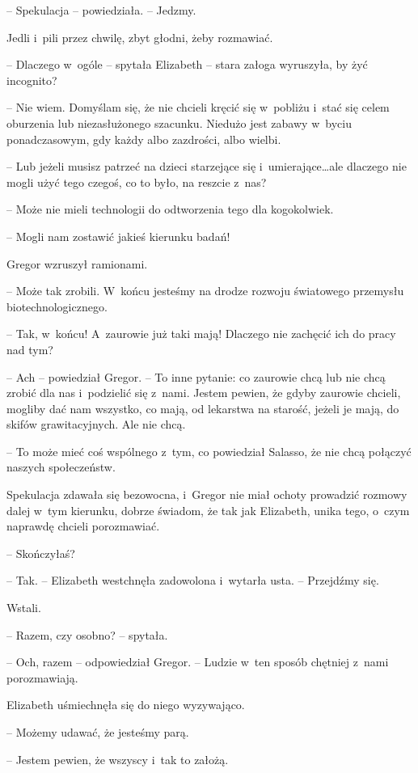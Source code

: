 \documentclass[oneside,polish,12pt,sfheadings]{mwbk}
\begin{document}
-- Spekulacja -- powiedziała. -- Jedzmy.

Jedli i~pili przez chwilę, zbyt głodni, żeby rozmawiać.

-- Dlaczego w~ogóle -- spytała Elizabeth -- stara załoga wyruszyła, by żyć
incognito?

-- Nie wiem. Domyślam się, że nie chcieli kręcić się w~pobliżu i~stać się
celem oburzenia lub niezasłużonego szacunku. Niedużo jest zabawy w~byciu
ponadczasowym, gdy każdy albo zazdrości, albo wielbi.

-- Lub jeżeli musisz patrzeć na dzieci starzejące się i~umierające\ldots ale
dlaczego nie mogli użyć tego czegoś, co to było, na reszcie z~nas?

-- Może nie mieli technologii do odtworzenia tego dla kogokolwiek.

-- Mogli nam zostawić jakieś kierunku badań!

Gregor wzruszył ramionami. 

-- Może tak zrobili. W~końcu jesteśmy na
drodze rozwoju światowego przemysłu biotechnologicznego.

-- Tak, w~końcu! A~zaurowie już taki mają! Dlaczego nie zachęcić ich do
pracy nad tym?

-- Ach -- powiedział Gregor. -- To inne pytanie: co zaurowie chcą lub nie
chcą zrobić dla nas i~podzielić się z~nami. Jestem pewien, że gdyby
zaurowie chcieli, mogliby dać nam wszystko, co mają, od lekarstwa na
starość, jeżeli je mają, do skifów grawitacyjnych. Ale nie chcą.

-- To może mieć coś wspólnego z~tym, co powiedział Salasso, że nie chcą
połączyć naszych społeczeństw.

Spekulacja zdawała się bezowocna, i~Gregor nie miał ochoty prowadzić
rozmowy dalej w~tym kierunku, dobrze świadom, że tak jak Elizabeth,
unika tego, o~czym naprawdę chcieli porozmawiać.

-- Skończyłaś?

-- Tak. -- Elizabeth westchnęła zadowolona i~wytarła usta. -- Przejdźmy
się.

Wstali.

-- Razem, czy osobno? -- spytała.

-- Och, razem -- odpowiedział Gregor. -- Ludzie w~ten sposób chętniej z~nami porozmawiają.

Elizabeth uśmiechnęła się do niego wyzywająco. 

-- Możemy udawać, że
jesteśmy parą.

-- Jestem pewien, że wszyscy i~tak to założą.
\end{document}
